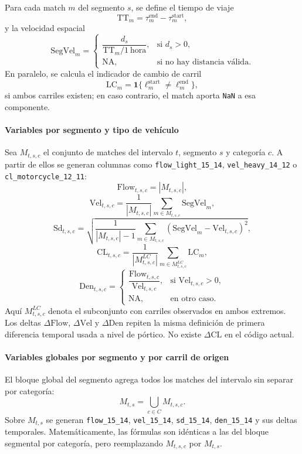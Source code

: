 Para cada match \(m\) del segmento \(s\), se define el tiempo de viaje
\[
\mathrm{TT}_m = \tau^{\mathrm{end}}_m - \tau^{\mathrm{start}}_m,
\]
y la velocidad espacial
\[
\mathrm{SegVel}_m =
\begin{cases}
\dfrac{d_s}{\mathrm{TT}_m/1\ \mathrm{hora}}, & \text{si } d_s > 0, \\
\mathrm{NA}, & \text{si no hay distancia v\'alida.}
\end{cases}
\]
En paralelo, se calcula el indicador de cambio de carril
\[
\mathrm{LC}_m =
\mathbf{1}\{\ell^{\mathrm{start}}_m \neq \ell^{\mathrm{end}}_m\},
\]
si ambos carriles existen; en caso contrario, el match aporta \texttt{NaN} a esa componente.

\paragraph{Variables por segmento y tipo de veh\'iculo}
Sea \(M_{t,s,c}\) el conjunto de matches del intervalo \(t\), segmento \(s\) y categor\'ia \(c\). A partir de ellos se generan columnas como \texttt{flow\_light\_15\_14}, \texttt{vel\_heavy\_14\_12} o \texttt{cl\_motorcycle\_12\_11}:
\[
\mathrm{Flow}_{t,s,c} = |M_{t,s,c}|,
\]
\[
\mathrm{Vel}_{t,s,c} = \frac{1}{|M_{t,s,c}|}\sum_{m \in M_{t,s,c}} \mathrm{SegVel}_m,
\]
\[
\mathrm{Sd}_{t,s,c} = \sqrt{\frac{1}{|M_{t,s,c}|-1}\sum_{m \in M_{t,s,c}}(\mathrm{SegVel}_m-\mathrm{Vel}_{t,s,c})^2},
\]
\[
\mathrm{CL}_{t,s,c} = \frac{1}{|M^{LC}_{t,s,c}|}\sum_{m \in M^{LC}_{t,s,c}} \mathrm{LC}_m,
\]
\[
\mathrm{Den}_{t,s,c} =
\begin{cases}
\dfrac{\mathrm{Flow}_{t,s,c}}{\mathrm{Vel}_{t,s,c}}, & \text{si } \mathrm{Vel}_{t,s,c} > 0, \\
\mathrm{NA}, & \text{en otro caso.}
\end{cases}
\]
Aqu\'i \(M^{LC}_{t,s,c}\) denota el subconjunto con carriles observados en ambos extremos. Los deltas \(\Delta \mathrm{Flow}\), \(\Delta \mathrm{Vel}\) y \(\Delta \mathrm{Den}\) repiten la misma definici\'on de primera diferencia temporal usada a nivel de p\'ortico. No existe \(\Delta \mathrm{CL}\) en el c\'odigo actual.

\paragraph{Variables globales por segmento y por carril de origen}
El bloque global del segmento agrega todos los matches del intervalo sin separar por categor\'ia:
\[
M_{t,s} = \bigcup_{c \in C} M_{t,s,c}.
\]
Sobre \(M_{t,s}\) se generan \texttt{flow\_15\_14}, \texttt{vel\_15\_14}, \texttt{sd\_15\_14}, \texttt{den\_15\_14} y sus deltas temporales. Matem\'aticamente, las f\'ormulas son id\'enticas a las del bloque segmental por categor\'ia, pero reemplazando \(M_{t,s,c}\) por \(M_{t,s}\).

